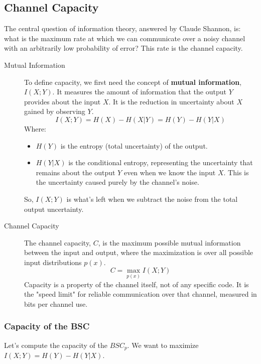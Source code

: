 \subsection{Channel Capacity}

The central question of information theory, answered by Claude Shannon, is: what is the maximum rate at which we can communicate over a noisy channel with an arbitrarily low probability of error? This rate is the channel capacity.

\begin{description}
    \item[Mutual Information] To define capacity, we first need the concept of \textbf{mutual information}, $I(X;Y)$. It measures the amount of information that the output $Y$ provides about the input $X$. It is the reduction in uncertainty about $X$ gained by observing $Y$.
    \[ I(X;Y) = H(X) - H(X|Y) = H(Y) - H(Y|X) \]
    Where:
    \begin{itemize}
        \item $H(Y)$ is the entropy (total uncertainty) of the output.
        \item $H(Y|X)$ is the conditional entropy, representing the uncertainty that remains about the output $Y$ even when we know the input $X$. This is the uncertainty caused purely by the channel's noise.
    \end{itemize}
    So, $I(X;Y)$ is what's left when we subtract the noise from the total output uncertainty.

    \item[Channel Capacity] The channel capacity, $C$, is the maximum possible mutual information between the input and output, where the maximization is over all possible input distributions $p(x)$.
    \[ C = \max_{p(x)} I(X;Y) \]
    Capacity is a property of the channel itself, not of any specific code. It is the "speed limit" for reliable communication over that channel, measured in bits per channel use.
\end{description}

\subsubsection{Capacity of the BSC}

Let's compute the capacity of the $BSC_p$. We want to maximize $I(X;Y) = H(Y) - H(Y|X)$.

